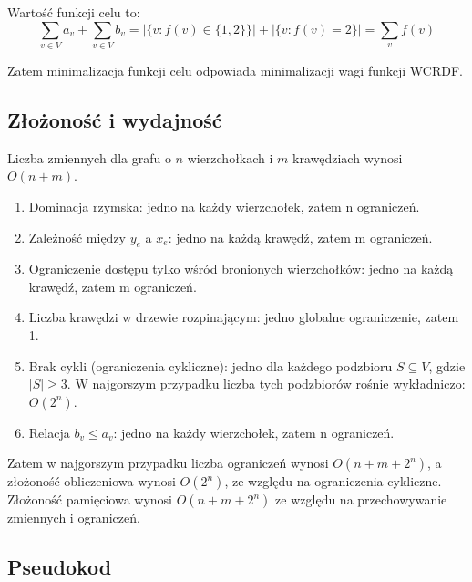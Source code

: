 Wartość funkcji celu to:
\[
\sum_{v \in V} a_v + \sum_{v \in V} b_v = |\{v : f(v) \in \{1,2\}\}| + |\{v : f(v) = 2\}|
= \sum_{v} f(v)
\]

Zatem minimalizacja funkcji celu odpowiada minimalizacji wagi funkcji WCRDF.

\subsection{Złożoność i wydajność}

Liczba zmiennych dla grafu o $n$ wierzchołkach i $m$ krawędziach wynosi $O(n+m)$.

\begin{enumerate}
    \item Dominacja rzymska: jedno na każdy wierzchołek, zatem  n ograniczeń.   
    \item Zależność między \( y_e \) a \( x_e \): jedno na każdą krawędź, zatem m ograniczeń.    
    \item Ograniczenie dostępu tylko wśród bronionych wierzchołków: jedno na każdą krawędź, zatem m ograniczeń.    
    \item Liczba krawędzi w drzewie rozpinającym: jedno globalne ograniczenie, zatem 1.  
    \item Brak cykli (ograniczenia cykliczne): jedno dla każdego podzbioru \( S \subseteq V \), gdzie \( |S| \geq 3 \). W najgorszym przypadku liczba tych podzbiorów rośnie wykładniczo: $O(2^n)$.  
    \item Relacja \( b_v \leq a_v \): jedno na każdy wierzchołek, zatem n ograniczeń.
\end{enumerate}

Zatem w najgorszym przypadku liczba ograniczeń wynosi $	O(n+m+2^n)$, a złożoność obliczeniowa wynosi $O(2^n)$, ze względu na ograniczenia cykliczne.\\
Złożoność pamięciowa wynosi $O(n+m+2^n)$ ze względu na przechowywanie zmiennych i ograniczeń.

\subsection{Pseudokod}

